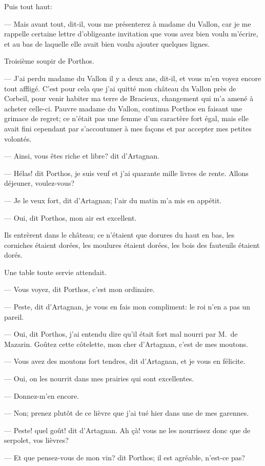 Puis tout haut:

— Mais avant tout, dit-il, vous me présenterez à madame du Vallon, car je me rappelle certaine lettre d'obligeante invitation que vous avez bien voulu m'écrire, et au bas de laquelle elle avait bien voulu ajouter quelques lignes.

Troisième soupir de Porthos.

— J'ai perdu madame du Vallon il y a deux ans, dit-il, et vous m'en voyez encore tout affligé. C'est pour cela que j'ai quitté mon château du Vallon près de Corbeil, pour venir habiter ma terre de Bracieux, changement qui m'a amené à acheter celle-ci. Pauvre madame du Vallon, continua Porthos en faisant une grimace de regret; ce n'était pas une femme d'un caractère fort égal, mais elle avait fini cependant par s'accoutumer à mes façons et par accepter mes petites volontés.

— Ainsi, vous êtes riche et libre? dit d'Artagnan.

— Hélas! dit Porthos, je suis veuf et j'ai quarante mille livres de rente. Allons déjeuner, voulez-vous?

— Je le veux fort, dit d'Artagnan; l'air du matin m'a mis en appétit.

— Oui, dit Porthos, mon air est excellent.

Ils entrèrent dans le château; ce n'étaient que dorures du haut en bas, les corniches étaient dorées, les moulures étaient dorées, les bois des fauteuils étaient dorés.

Une table toute servie attendait.

— Vous voyez, dit Porthos, c'est mon ordinaire.

— Peste, dit d'Artagnan, je vous en fais mon compliment: le roi n'en a pas un pareil.

— Oui, dit Porthos, j'ai entendu dire qu'il était fort mal nourri par M.~de Mazarin. Goûtez cette côtelette, mon cher d'Artagnan, c'est de mes moutons.

— Vous avez des moutons fort tendres, dit d'Artagnan, et je vous en félicite.

— Oui, on les nourrit dans mes prairies qui sont excellentes.

— Donnez-m'en encore.

— Non; prenez plutôt de ce lièvre que j'ai tué hier dans une de mes garennes.

— Peste! quel goût! dit d'Artagnan. Ah çà! vous ne les nourrissez donc que de serpolet, vos lièvres?

— Et que pensez-vous de mon vin? dit Porthos; il est agréable, n'est-ce pas?

